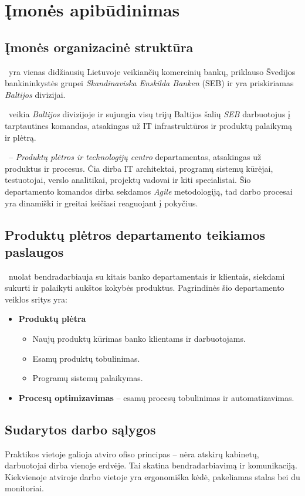\section{Įmonės apibūdinimas}

\subsection{Įmonės organizacinė struktūra}
\SEB~yra vienas didžiausių Lietuvoje veikiančių komercinių bankų, priklauso Švedijos bankininkystės grupei \textit{Skandinaviska Enskilda Banken} (SEB) ir yra priskiriamas \textit{Baltijos} divizijai. 

\PDT~veikia \textit{Baltijos} divizijoje ir sujungia visų trijų Baltijos šalių \textit{SEB} darbuotojus į tarptautines komandas, atsakingas už IT infrastruktūros ir produktų palaikymą ir plėtrą.

\PD~-- \textit{Produktų plėtros ir technologijų centro} departamentas, atsakingas už produktus ir procesus. Čia dirba IT architektai, programų sistemų kūrėjai, testuotojai, verslo analitikai, projektų vadovai ir kiti specialistai. Šio departamento komandos dirba sekdamos \textit{Agile} \cite{cohenIntroductionAgileMethods2004} metodologiją, tad darbo procesai yra dinamiški ir greitai keičiasi reaguojant į pokyčius.

\subsection{Produktų plėtros departamento teikiamos paslaugos}

\PD~nuolat bendradarbiauja su kitais banko departamentais ir klientais, siekdami sukurti ir palaikyti aukštos kokybės produktus. Pagrindinės šio departamento veiklos sritys yra:
\begin{itemize}
    \item \textbf{Produktų plėtra}
    \begin{itemize}
        \item Naujų produktų kūrimas banko klientams ir darbuotojams.
        \item Esamų produktų tobulinimas.
        \item Programų sistemų palaikymas.
    \end{itemize}
    \item \textbf{Procesų optimizavimas} -- esamų procesų tobulinimas ir automatizavimas.
\end{itemize}

\subsection{Sudarytos darbo sąlygos}
Praktikos vietoje galioja atviro ofiso  principas -- nėra atskirų kabinetų, darbuotojai dirba vienoje erdvėje. Tai skatina bendradarbiavimą ir komunikaciją. Kiekvienoje atviroje darbo vietoje yra ergonomiška kėdė, pakeliamas stalas bei du monitoriai.